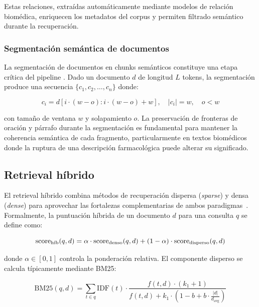 Estas relaciones, extraídas automáticamente mediante modelos de relación biomédica, enriquecen los metadatos del corpus y permiten filtrado semántico durante la recuperación.

\subsubsection{Segmentación semántica de documentos}

La segmentación de documentos en chunks semánticos constituye una etapa crítica del pipeline \rag{}. Dado un documento $d$ de longitud $L$ tokens, la segmentación produce una secuencia $\{c_1, c_2, \ldots, c_n\}$ donde:

\begin{equation}
\label{eq:chunking}
  c_i = d[i \cdot (w - o) : i \cdot (w - o) + w], \quad |c_i| = w, \quad o < w
\end{equation}

\noindent con tamaño de ventana $w$ y solapamiento $o$. La preservación de fronteras de oración y párrafo durante la segmentación es fundamental para mantener la coherencia semántica de cada fragmento, particularmente en textos biomédicos donde la ruptura de una descripción farmacológica puede alterar su significado.

\subsection{Retrieval híbrido}
\label{subsec:tf_hybrid_retrieval}

El retrieval híbrido combina métodos de recuperación dispersa (\textit{sparse}) y densa (\textit{dense}) para aprovechar las fortalezas complementarias de ambos paradigmas~\cite{karpukhin2020dense}. Formalmente, la puntuación híbrida de un documento $d$ para una consulta $q$ se define como:

\begin{equation}
\label{eq:hybrid_retrieval}
  \operatorname{score}_{\text{híb}}(q, d) = \alpha \cdot \operatorname{score}_{\text{denso}}(q, d) + (1 - \alpha) \cdot \operatorname{score}_{\text{disperso}}(q, d)
\end{equation}

\noindent donde $\alpha \in [0, 1]$ controla la ponderación relativa. El componente disperso se calcula típicamente mediante BM25:

\begin{equation}
\label{eq:bm25}
  \text{BM25}(q, d) = \sum_{t \in q} \text{IDF}(t) \cdot \frac{f(t, d) \cdot (k_1 + 1)}{f(t, d) + k_1 \cdot \left(1 - b + b \cdot \frac{|d|}{d_{\text{avg}}}\right)}
\end{equation}


